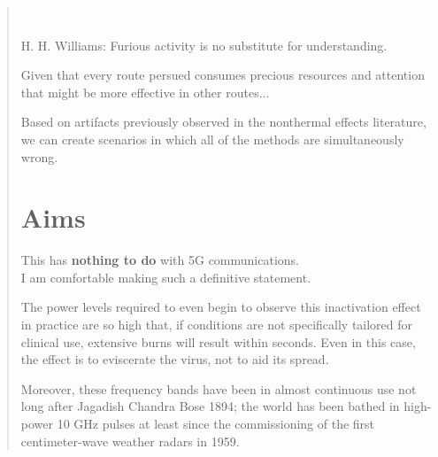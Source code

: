 \documentclass[paper.tex]{subfiles}
\begin{document}
\null\begin{tabular}[t]{l@{}}
	  \\
	
\end{tabular}



\begin{quotation}\

H. H. Williams: Furious activity is no substitute for understanding.

Given that every route persued consumes precious resources and attention that might be more effective in 
other routes...



Based on artifacts previously observed in the nonthermal effects literature, we can create scenarios in which all of the methods are simultaneously wrong. 

\section{Aims}




\begin{autem}
	
	{\Large {This has \textbf{nothing to do} with 5G communications.}}\\
	
	I am comfortable making such a definitive statement.
	
	The power levels required to even begin to observe this inactivation effect in practice are so high that, if conditions are not specifically tailored for clinical use, extensive burns will result within seconds. Even in this case, the effect is to eviscerate the virus, not to aid its spread. 
	
	Moreover, these frequency bands have been in almost continuous use not long after Jagadish Chandra Bose 1894; the world has been bathed in high-power 10 GHz pulses at least since the commissioning of the first centimeter-wave weather radars in 1959. 
	

\end{autem}
\end{quotation}
\end{document}
